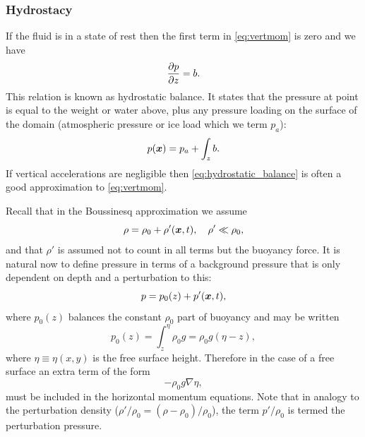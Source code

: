 \subsubsection{Hydrostacy}
If the fluid is in a state of rest then the first term in \eqref{eq:vertmom} is zero and
we have 
\begin{equation}\label{eq:hydrostatic_balance}
\ppx[z]{p} = b.
\end{equation}
This relation is known as hydrostatic balance. It states that the pressure at point
is equal to the weight or water above, plus any pressure loading on the surface of the
domain (\eg atmospheric pressure or ice load which we term $p_a$):
\begin{equation*}
p(\bmx) = p_a + \int_z b.
\end{equation*}
If vertical accelerations are negligible then \eqref{eq:hydrostatic_balance} is
often a good approximation to \eqref{eq:vertmom}.

Recall that in the Boussinesq approximation we assume 
\begin{equation*}
\rho = \rho_0 + \rho'(\bmx,t),\quad \rho'\ll\rho_0,
\end{equation*}
and that $\rho'$ is assumed not to count in all terms but the buoyancy force. 
It is natural now to define pressure in terms of a background pressure that is
only dependent on depth and a perturbation to this:
\begin{equation*}
p=p_0(z)+p'(\bmx,t),
\end{equation*}
where $p_0(z)$ balances the constant $\rho_0$ part of buoyancy and may be written
\begin{equation*}
p_0(z) = \int_z^\eta \rho_0 g = \rho_0 g(\eta - z),
\end{equation*}
where $\eta\equiv\eta(x,y)$ is the free surface height. Therefore in
the case of a free surface an extra term of the form
\begin{equation*}
-\rho_0g\nabla\eta,
\end{equation*}
must be included in the horizontal momentum equations. 
Note that in analogy to the perturbation density ($\rho'/\rho_0 = (\rho-\rho_0)/\rho_0$), the
term $p'/\rho_0$ is termed the perturbation pressure.





